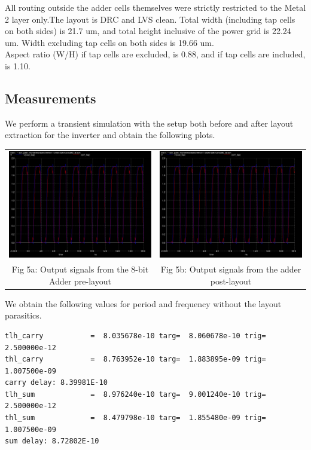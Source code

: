 \documentclass[12pt,a4paper]{article}
\begin{document}
\noindent All routing outside the adder cells themselves were strictly restricted to the Metal 2 layer only.The layout is DRC and LVS clean. Total width (including tap cells on both sides) is 21.7 um, and total height inclusive of the power grid is 22.24 um. Width excluding tap cells on both sides is 19.66 um. \\
\noindent Aspect ratio (W/H) if tap cells are excluded, is 0.88, and if tap cells are included, is 1.10.

\subsection{Measurements}
\noindent We perform a transient simulation with the setup both before and after layout extraction for the inverter and obtain the following plots.
\begin{center}
\begin{tabular}{cc}
     \includegraphics[width=0.47\linewidth]{tut6/rca/pre-layout-waveforms.png} &
     \includegraphics[width=0.47\linewidth]{tut6/rca/post-layout-waveforms.png} \\
     Fig 5a: Output signals from the 8-bit Adder pre-layout & Fig 5b: Output signals from the adder post-layout
\end{tabular}
\end{center}
\noindent We obtain the following values for period and frequency without the layout parasitics.
\begin{verbatim}
tlh_carry           =  8.035678e-10 targ=  8.060678e-10 trig=  2.500000e-12
thl_carry           =  8.763952e-10 targ=  1.883895e-09 trig=  1.007500e-09
carry delay: 8.39981E-10
tlh_sum             =  8.976240e-10 targ=  9.001240e-10 trig=  2.500000e-12
thl_sum             =  8.479798e-10 targ=  1.855480e-09 trig=  1.007500e-09
sum delay: 8.72802E-10
\end{verbatim}
\end{document}
